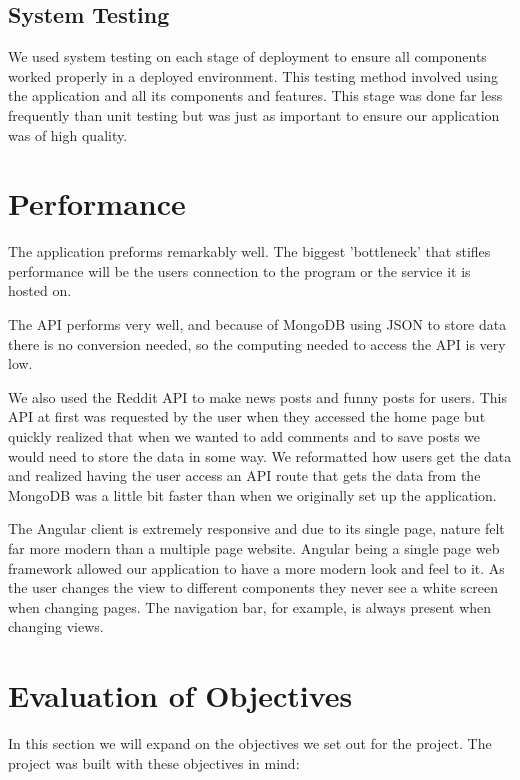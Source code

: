 \subsection{System Testing}
We used system testing on each stage of deployment to ensure all components worked properly in a deployed environment. This testing method involved using the application and all its components and features. This stage was done far less frequently than unit testing but was just as important to ensure our application was of high quality.

\section{Performance}
The application preforms remarkably well. The biggest 'bottleneck' that stifles performance will be the users connection to the program or the service it is hosted on.

The API performs very well, and because of MongoDB using JSON to store data there is no conversion needed, so the computing needed to access the API is very low.

We also used the Reddit API to make news posts and funny posts for users. This API at first was requested by the user when they accessed the home page but quickly realized that when we wanted to add comments and to save posts we would need to store the data in some way. We reformatted how users get the data and realized having the user access an API route that gets the data from the MongoDB was a little bit faster than when we originally set up the application.

The Angular client is extremely responsive and due to its single page, nature felt far more modern than a multiple page website. Angular being a single page web framework allowed our application to have a more modern look and feel to it. As the user changes the view to different components they never see a white screen when changing pages. The navigation bar, for example, is always present when changing views.

\section{Evaluation of Objectives}
In this section we will expand on the objectives we set out for the project. The project was built with these objectives in mind:


